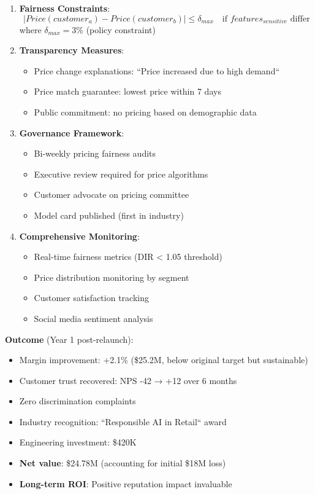 \begin{enumerate}
    \item \textbf{Fairness Constraints}:
        \begin{equation}
        |Price(customer_a) - Price(customer_b)| \leq \delta_{max} \quad \text{if } features_{sensitive} \text{ differ}
        \end{equation}
        where $\delta_{max} = 3\%$ (policy constraint)

    \item \textbf{Transparency Measures}:
        \begin{itemize}
            \item Price change explanations: ``Price increased due to high demand``
            \item Price match guarantee: lowest price within 7 days
            \item Public commitment: no pricing based on demographic data
        \end{itemize}

    \item \textbf{Governance Framework}:
        \begin{itemize}
            \item Bi-weekly pricing fairness audits
            \item Executive review required for price algorithms
            \item Customer advocate on pricing committee
            \item Model card published (first in industry)
        \end{itemize}

    \item \textbf{Comprehensive Monitoring}:
        \begin{itemize}
            \item Real-time fairness metrics (DIR < 1.05 threshold)
            \item Price distribution monitoring by segment
            \item Customer satisfaction tracking
            \item Social media sentiment analysis
        \end{itemize}
\end{enumerate}

\textbf{Outcome} (Year 1 post-relaunch):
\begin{itemize}
    \item Margin improvement: +2.1\% (\$25.2M, below original target but sustainable)
    \item Customer trust recovered: NPS -42 → +12 over 6 months
    \item Zero discrimination complaints
    \item Industry recognition: ``Responsible AI in Retail`` award
    \item Engineering investment: \$420K
    \item \textbf{Net value}: \$24.78M (accounting for initial \$18M loss)
    \item \textbf{Long-term ROI}: Positive reputation impact invaluable
\end{itemize}

